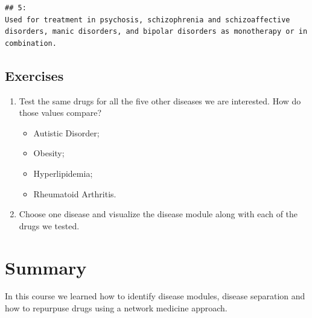 \documentclass[
]{book}
\providecommand{\tightlist}{%
  \setlength{\itemsep}{0pt}\setlength{\parskip}{0pt}}
\begin{document}
\begin{verbatim}
## 5:                                                                                                                                                                                                                                                                                                                                                                                                                                                                                                                                                                                                                                                                                                                                                                                                                                                                                                                                                                                                                                                                                                                                                                                                                                                                                                                                                                                                                                                                                                                                                                                                                                                                      Used for treatment in psychosis, schizophrenia and schizoaffective disorders, manic disorders, and bipolar disorders as monotherapy or in combination.
\end{verbatim}

\hypertarget{exercises-5}{%
\section{Exercises}\label{exercises-5}}

\begin{enumerate}
\def\labelenumi{\arabic{enumi}.}
\item
  Test the same drugs for all the five other diseases we are interested. How do those values compare?

  \begin{itemize}
  \tightlist
  \item
    Autistic Disorder;
  \item
    Obesity;
  \item
    Hyperlipidemia;
  \item
    Rheumatoid Arthritis.
  \end{itemize}
\item
  Choose one disease and visualize the disease module along with each of the drugs we tested.
\end{enumerate}

\hypertarget{summary}{%
\chapter{Summary}\label{summary}}

In this course we learned how to identify disease modules, disease separation and how to repurpuse drugs using a network medicine approach.

  
\end{document}
